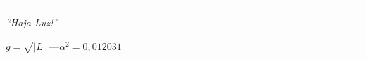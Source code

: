 \documentclass[12pt, a4paper]{article}
\theoremstyle{tglstyle}
\theoremstyle{definition}
\newcommand{\alphaq}{\alpha^2}
\begin{document}
\begin{titlepage}
\begin{center}
\vspace{2cm}

\rule{0.6\textwidth}{0.5pt}

\vspace{0.5cm}

{\large\itshape ``Haja Luz!''}

\vspace{0.3cm}

{\small $g = \sqrt{|L|}$ \quad---\quad $\alphaq = 0{,}012031$}

\end{center}
\end{titlepage}

\newpage
\end{document}
